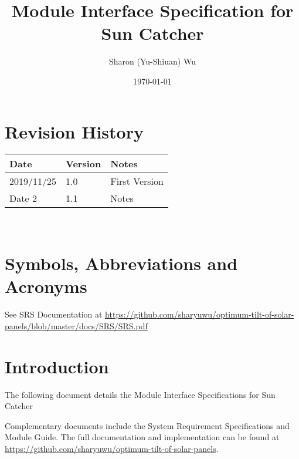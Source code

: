 \documentclass[12pt, titlepage]{article}
\newcommand{\progname}{Sun Catcher}
\begin{document}
\title{Module Interface Specification for \progname}

\author{Sharon (Yu-Shiuan) Wu}

\date{\today}

\maketitle


\section{Revision History}

\begin{tabularx}{\textwidth}{p{3cm}p{2cm}X}
\toprule {\bf Date} & {\bf Version} & {\bf Notes}\\
\midrule
2019/11/25 & 1.0 & First Version\\
Date 2 & 1.1 & Notes\\
\bottomrule
\end{tabularx}

~\newpage

\section{Symbols, Abbreviations and Acronyms}

See SRS Documentation at \url{https://github.com/sharyuwu/optimum-tilt-of-solar-panels/blob/master/docs/SRS/SRS.pdf}


\newpage

\tableofcontents

\newpage


\section{Introduction}

The following document details the Module Interface Specifications for \progname
{}

Complementary documents include the System Requirement Specifications
and Module Guide.  The full documentation and implementation can be
found at \url{https://github.com/sharyuwu/optimum-tilt-of-solar-panels}.  
\end{document}
